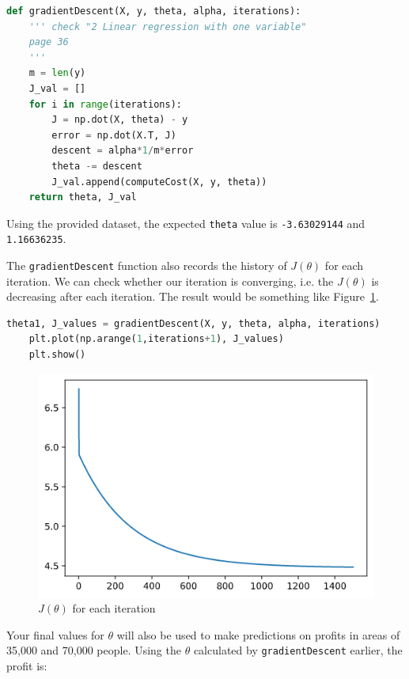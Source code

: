\documentclass{article}
\begin{document}
\begin{lstlisting}[language=Python]
def gradientDescent(X, y, theta, alpha, iterations):
    ''' check "2 Linear regression with one variable"
    page 36
    '''
    m = len(y)
    J_val = []
    for i in range(iterations):
        J = np.dot(X, theta) - y
        error = np.dot(X.T, J)
        descent = alpha*1/m*error
        theta -= descent
        J_val.append(computeCost(X, y, theta))
    return theta, J_val
\end{lstlisting}

Using the provided dataset, the expected \texttt{theta} value is \texttt{-3.63029144} and \texttt{1.16636235}.

The \texttt{gradientDescent} function also records the history of $J(\theta)$ for each iteration. We can check whether our iteration is converging, i.e. the $J(\theta)$ is decreasing after each iteration. The result would be something like Figure~\ref{fig:cost}.

\begin{lstlisting}[language=Python]
    theta1, J_values = gradientDescent(X, y, theta, alpha, iterations)
    plt.plot(np.arange(1,iterations+1), J_values)
    plt.show()
\end{lstlisting}

\begin{figure}[h!]
  \centering
  \includegraphics[scale=0.6]{cost.png}
  \caption{$J(\theta)$ for each iteration}
  \label{fig:cost}
\end{figure}

Your final values for $\theta$ will also be used to make predictions on profits in areas of 35,000 and 70,000 people. Using the $\theta$ calculated by \texttt{gradientDescent} earlier, the profit is:
\end{document}
